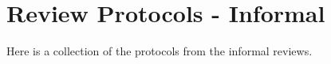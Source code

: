 \documentclass[a4paper]{article}
\begin{document}
\newpage
\section{Review Protocols - Informal}
Here is a collection of the protocols from the informal reviews.










\end{document}
